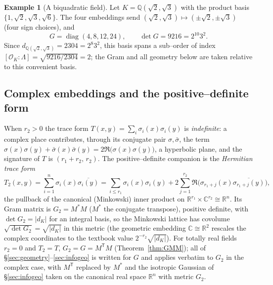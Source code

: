 \documentclass[11pt]{article}
\theoremstyle{plain}
\theoremstyle{definition}
\newtheorem{example}[theorem]{Example}
\theoremstyle{remark}
\newcommand{\Q}{\mathbb{Q}}
\newcommand{\R}{\mathbb{R}}
\newcommand{\C}{\mathbb{C}}
\newcommand{\K}{K}
\newcommand{\OK}{\mathcal{O}_K}
\newcommand{\GG}{G}
\newcommand{\transpose}{^{\mathsf{T}}}
\DeclareMathOperator{\diag}{diag}
\begin{document}
\begin{example}[A biquadratic field]\label{ex:biquad}
Let $\K=\Q(\sqrt2,\sqrt3)$ with the product basis $\{1,\sqrt2,\sqrt3,\sqrt6\}$. The four embeddings send
$(\sqrt2,\sqrt3)\mapsto(\pm\sqrt2,\pm\sqrt3)$ (four sign choices), and
\[
  \GG=\diag(4,8,12,24),\qquad \det\GG = 9216 = 2^{10}3^2 .
\]
Since $d_{\Q(\sqrt2,\sqrt3)}=2304=2^8 3^2$, this basis spans a sub--order of index
$[\OK:\Lambda]=\sqrt{9216/2304}=2$; the Gram and all geometry below are taken relative to this convenient
basis.
\end{example}

\subsection{Complex embeddings and the positive--definite form}\label{subsec:complex}
When $r_2>0$ the trace form $T(x,y)=\sum_i\sigma_i(x)\sigma_i(y)$ is \emph{indefinite}: a complex place
contributes, through its conjugate pair $\sigma,\bar\sigma$, the term
$\sigma(x)\sigma(y)+\bar\sigma(x)\bar\sigma(y)=2\Re\big(\sigma(x)\sigma(y)\big)$, a hyperbolic plane, and the
signature of $T$ is $(r_1+r_2,\,r_2)$. The positive--definite companion is the \emph{Hermitian trace form}
\begin{equation}\label{eq:T2}
  T_2(x,y)=\sum_{i=1}^n\sigma_i(x)\overline{\sigma_i(y)}
  =\sum_{i\le r_1}\sigma_i(x)\sigma_i(y)
   +2\sum_{j=1}^{r_2}\Re\big(\sigma_{r_1+j}(x)\overline{\sigma_{r_1+j}(y)}\big),
\end{equation}
the pullback of the canonical (Minkowski) inner product on $\R^{r_1}\times\C^{r_2}\cong\R^n$. Its Gram matrix
is $G_2=M^{*}M$ ($M^{*}$ the conjugate transpose), positive definite, with $\det G_2=|d_\K|$ for an integral
basis, so the Minkowski lattice has covolume $\sqrt{\det G_2}=\sqrt{|d_\K|}$ in this metric (the geometric
embedding $\C\cong\R^2$ rescales the complex coordinates to the textbook value $2^{-r_2}\sqrt{|d_\K|}$). For
totally real fields $r_2=0$ and $T_2=T$,
$G_2=\GG=M\transpose M$ (Theorem~\ref{thm:GMM}); all of \S\ref{sec:geometry}--\ref{sec:infogeo} is written for
$\GG$ and applies verbatim to $G_2$ in the complex case, with $M\transpose$ replaced by $M^{*}$ and the
isotropic Gaussian of \S\ref{sec:infogeo} taken on the canonical real space $\R^n$ with metric $G_2$.
\end{document}
